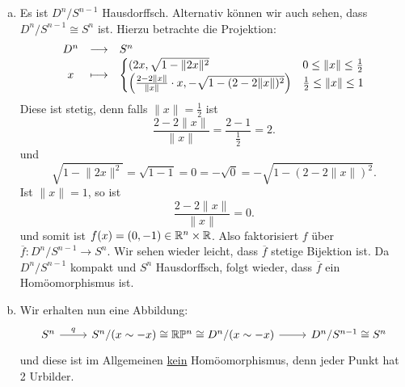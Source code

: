 \begin{example}
    \begin{enumerate}[a)]
        \item
Es ist $D^n / S^{n-1}$   Hausdorffsch. Alternativ können wir auch sehen, dass $D^n / S^{n-1} \cong S^n$ ist. Hierzu betrachte die Projektion:
    \begin{equation*}
    \begin{array}{c c l} 
    D^n & \longrightarrow & S^n \\
    x & \longmapsto &  \begin{cases}
        (2x, \sqrt{1-\lVert 2x \rVert ^2} & 0 \leq  \lVert x \rVert \leq \frac{1}{2}  \\
        \left( \frac{2-2\lVert x \rVert }{\lVert x \rVert }\cdot x, - \sqrt{1-(2-2\lVert x \rVert )^2}  \right) & \frac{1}{2} \leq  \lVert x \rVert  \leq 1
    \end{cases}
    \end{array}
\end{equation*}
Diese ist stetig, denn falls $\lVert x \rVert =\frac{1}{2}$ ist
\[
\frac{2-2\lVert x \rVert }{\lVert x \rVert } = \frac{2-1}{\frac{1}{2}} = 2
.\] 
und
\[
    \sqrt{1-\lVert 2x \rVert ^2} = \sqrt{1-1} =0 = - \sqrt{0} = -\sqrt{1-(2-2\lVert x \rVert )^2}  
.\] 
Ist $\lVert x \rVert =1$, so ist
 \[
\frac{2-2\lVert x \rVert }{\lVert x \rVert } = 0
.\] 
und somit ist $f(x) = (0,-1) \in \mathbb{R}^n \times \mathbb{R}$. Also faktorisiert $f$ über  $\overline{f} : D^n / S^{n-1} \to  S^n$. Wir sehen wieder leicht, dass $\overline{f}$ stetige Bijektion ist. Da $D^n / S^{n-1}$ kompakt und $S^n$ Hausdorffsch, folgt wieder, dass  $\overline{f}$ ein Homöomorphismus ist. \\
\item Wir erhalten nun eine Abbildung:
    \[
    \begin{tikzcd}
        S^n \ar{r}{q} & S^n / (x\sim -x) \cong \R\mathbb{P}^n \cong D^n / (x\sim -x) \ar{r} &  D^n / S^{n-1} \cong S^n
    \end{tikzcd}
\]
und diese ist im Allgemeinen \underline{kein} Homöomorphismus, denn jeder Punkt hat 2 Urbilder.
    \end{enumerate}
\end{example}

\def\Base{\mathcal{S}} %
